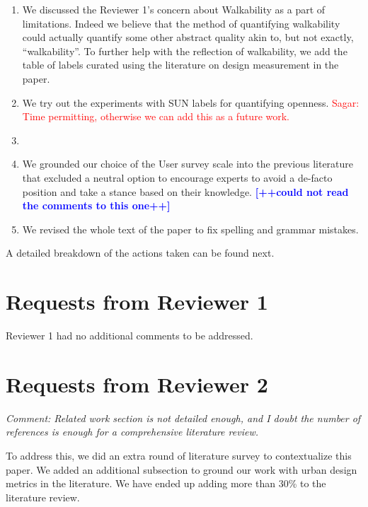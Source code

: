 \documentclass{paper}
\newenvironment{myquote}
{\definecolor{shadecolor}{rgb}{0.9,0.95,1} \begin{shaded*} \sf \em}
{\em\end{shaded*}}
\newcommand{\sj}[1]{\textcolor{red}{Sagar: #1}}
\begin{document}
\begin{enumerate}


\item We discussed the Reviewer 1's concern about Walkability as a part of limitations. Indeed we believe that the method of quantifying walkability could actually quantify some other abstract quality akin to, but not exactly, ``walkability''. To further help with the reflection of walkability, we add the table of labels curated using the literature on design measurement in the paper. 

\item We try out the experiments with SUN labels for quantifying openness. \sj{Time permitting, otherwise we can add this as a future work. }

\item 

\item We grounded our choice of the User survey scale into the previous literature that excluded a neutral option to encourage experts to avoid a de-facto position and take a stance based on their knowledge. \textcolor{blue}{\textbf{[++could not read the comments to this one++]}}


\item We revised the whole text of the paper to fix spelling and grammar mistakes.

\end{enumerate}

A detailed breakdown of the actions taken can be found next.

\section*{Requests from Reviewer 1}

\noindent Reviewer 1 had no additional comments to be addressed.

\section*{Requests from Reviewer 2}

\begin{myquote}
\noindent Comment: Related work section is not detailed enough, and I doubt the number of references is enough for a comprehensive literature review.
\end{myquote}

\noindent To address this, we did an extra round of literature survey to  contextualize this paper. We added an additional subsection to ground our work with urban design metrics in the literature. We have ended up adding more than 30\% to the literature review. 
\end{document}
